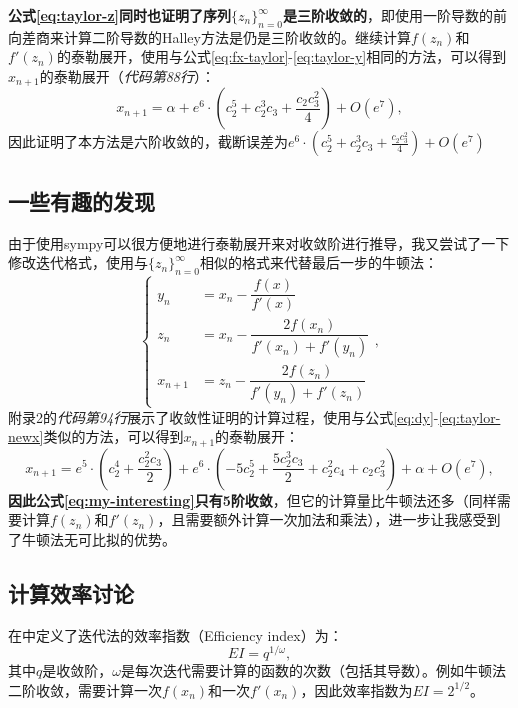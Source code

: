 \textbf{公式\ref{eq:taylor-z}同时也证明了序列$\{z_n\}_{n=0}^\infty$是三阶收敛的}，即使用一阶导数的前向差商来计算二阶导数的Halley方法是仍是三阶收敛的。继续计算$f(z_n)$和$f'(z_n)$的泰勒展开，使用与公式\ref{eq:fx-taylor}-\ref{eq:taylor-y}相同的方法，可以得到$x_{n+1}$的泰勒展开（\textit{代码第88行}）：
\begin{equation}
    \label{eq:taylor-newx}
    x_{n+1} = \alpha + e^{6} \cdot \left(c_{2}^{5} + c_{2}^{3} c_{3} + \frac{c_{2} c_{3}^{2}}{4}\right) + O\left(e^{7}\right),
\end{equation}
因此证明了本方法是六阶收敛的，截断误差为$e^{6} \cdot \left(c_{2}^{5} + c_{2}^{3} c_{3} + \frac{c_{2} c_{3}^{2}}{4}\right) + O\left(e^{7}\right)$


\subsection{一些有趣的发现}

由于使用sympy可以很方便地进行泰勒展开来对收敛阶进行推导，我又尝试了一下修改迭代格式，使用与$\{z_n\}_{n=0}^\infty$相似的格式来代替最后一步的牛顿法：
\begin{equation}
    \label{eq:my-interesting}
    \begin{cases}
        y_n &= x_n - \dfrac{f(x)}{f'(x)} \\
        z_n &= x_n - \dfrac{2f(x_n)}{f'(x_n) + f'(y_n)} \\
        x_{n+1} &= z_n - \dfrac{2f(z_n)}{f'(y_n) + f'(z_n)}
    \end{cases},
\end{equation}
附录2的\textit{代码第94行}展示了收敛性证明的计算过程，使用与公式\ref{eq:dy}-\ref{eq:taylor-newx}类似的方法，可以得到$x_{n+1}$的泰勒展开：
\begin{equation}
    x_{n+1} = e^{5} \cdot \left(c_{2}^{4} + \frac{c_{2}^{2} c_{3}}{2}\right) + e^{6} \cdot \left(- 5 c_{2}^{5} + \frac{5 c_{2}^{3} c_{3}}{2} + c_{2}^{2} c_{4} + c_{2} c_{3}^{2}\right) + \alpha + O\left(e^{7}\right),
\end{equation}
\textbf{因此公式\ref{eq:my-interesting}只有5阶收敛}，但它的计算量比牛顿法还多（同样需要计算$f(z_n)$和$f'(z_n)$，且需要额外计算一次加法和乘法），进一步让我感受到了牛顿法无可比拟的优势。


\subsection{计算效率讨论}

在\cite{househol1967ostrowski}中定义了迭代法的效率指数（Efficiency index）为：
\begin{equation}
    \label{eq:EI}
    EI = q^{1/\omega},
\end{equation}
其中$q$是收敛阶，$\omega$是每次迭代需要计算的函数的次数（包括其导数）。例如牛顿法二阶收敛，需要计算一次$f(x_n)$和一次$f'(x_n)$，因此效率指数为$EI=2^{1/2}$。

